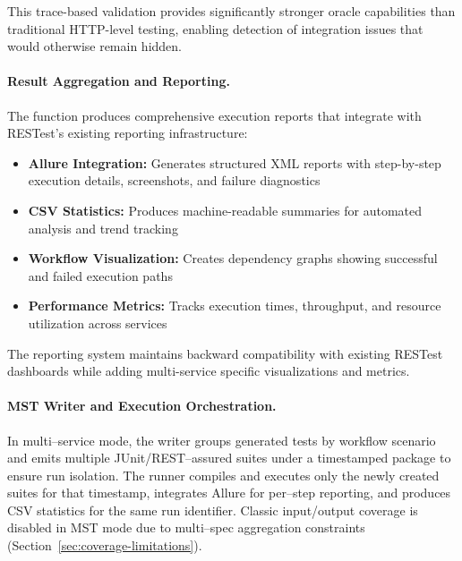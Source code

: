 \documentclass[conference]{IEEEtran}
\begin{document}
This trace-based validation provides significantly stronger oracle
capabilities than traditional HTTP-level testing, enabling detection
of integration issues that would otherwise remain hidden.

\paragraph{Result Aggregation and Reporting.}
The  function produces comprehensive execution
reports that integrate with RESTest's existing reporting infrastructure:

\begin{itemize}[leftmargin=*]
  \item \textbf{Allure Integration:} Generates structured XML reports
        with step-by-step execution details, screenshots, and
        failure diagnostics
  \item \textbf{CSV Statistics:} Produces machine-readable summaries
        for automated analysis and trend tracking
  \item \textbf{Workflow Visualization:} Creates dependency graphs
        showing successful and failed execution paths
  \item \textbf{Performance Metrics:} Tracks execution times,
        throughput, and resource utilization across services
\end{itemize}

The reporting system maintains backward compatibility with existing
RESTest dashboards while adding multi-service specific visualizations
and metrics.


\paragraph{MST Writer and Execution Orchestration.}
In multi–service mode, the writer groups generated tests by workflow scenario and emits multiple JUnit/REST–assured suites under a timestamped package to ensure run isolation. The runner compiles and executes only the newly created suites for that timestamp, integrates Allure for per–step reporting, and produces CSV statistics for the same run identifier. Classic input/output coverage is disabled in MST mode due to multi–spec aggregation constraints (Section~\ref{sec:coverage-limitations}).
\end{document}
